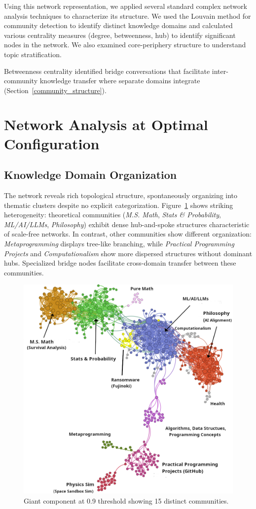 \documentclass{svproc}
\begin{document}
Using this network representation, we applied several standard complex network analysis techniques to characterize its structure. We used the Louvain method \cite{blondel2008} for community detection to identify distinct knowledge domains and calculated various centrality measures (degree, betweenness, hub) to identify significant nodes in the network. We also examined core-periphery structure to understand topic stratification.

Betweenness centrality identified bridge conversations that facilitate inter-community knowledge transfer where separate domains integrate (Section~\ref{community_structure}).

\section{Network Analysis at Optimal Configuration}

\subsection{Knowledge Domain Organization}

The network reveals rich topological structure, spontaneously organizing into thematic clusters despite no explicit categorization. Figure~\ref{fig:network_vis} shows striking heterogeneity: theoretical communities (\emph{M.S. Math}, \emph{Stats \& Probability}, \emph{ML/AI/LLMs}, \emph{Philosophy}) exhibit dense hub-and-spoke structures characteristic of scale-free networks. In contrast, other communities show different organization: \emph{Metaprogramming} displays tree-like branching, while \emph{Practical Programming Projects} and \emph{Computationalism} show more dispersed structures without dominant hubs. Specialized bridge nodes facilitate cross-domain transfer between these communities.

\begin{figure}[t]
\centering
\includegraphics[width=4.5in]{./images/cluster-vis-topics-better.png}
\caption{Giant component at 0.9 threshold showing 15 distinct communities.}
\label{fig:network_vis}
\end{figure}
\end{document}

